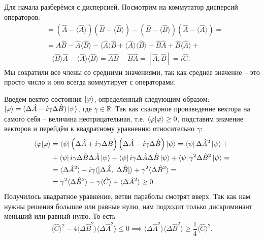 Для начала разберёмся с дисперсией. Посмотрим на коммутатор дисперсий операторов:
\begin{align*}
    [\Delta \hat A, \Delta \hat B] &= \left( \hat A - \langle \hat A \rangle \right) \left( \hat B - \langle \hat B \rangle \right) - \left( \hat B - \langle \hat B \rangle \right) \left( \hat A - \langle \hat A \rangle \right) =\\
    &= \hat A \hat B - \hat A \langle \hat B \rangle - \langle \hat A \rangle \hat B + \langle \hat A \rangle \langle \hat B \rangle - \hat B \hat A + \hat B \langle \hat A \rangle + \\
    &+ \langle \hat B \rangle \hat A - \langle \hat A \rangle \langle \hat B \rangle = \hat A \hat B - \hat B \hat A = [\hat A, \hat B] = i\hat C.
\end{align*}
Мы сократили все члены со средними значениями, так как среднее значение -- это просто число и оно всегда коммутирует с операторами.

Введём вектор состояния $\ket{\varphi}$, определенный следующим образом: $\ket{\varphi} = (\Delta\hat A - i\gamma\Delta\hat B)\ket{\psi}$, где $\gamma \in \mathbb{R}$. Так как скалярное произведение вектора на самого себя -- величина неотрицательная, т.е. $\bra{\varphi}\ket{\varphi} \geq 0$, подставим значение векторов и перейдём к квадратному уравнению относительно $\gamma$:
\begin{align*}
    \bra{\varphi} \ket{\varphi} &= \bra{\psi} \left( \Delta \hat A + i \gamma \Delta \hat B \right) \left( \Delta \hat A - i \gamma \Delta \hat B \right) \ket{\psi} = \bra{\psi} \Delta \hat{A}^2 \ket{\psi} + \\
    &+ \bra{\psi} i \gamma \Delta \hat{B} \Delta \hat{A} \ket{\psi} - \bra{\psi} i \gamma \Delta \hat{A} \Delta \hat{B} \ket{\psi} + \bra{\psi} \gamma^2 \Delta \hat{B}^2 \ket{\psi} = \\
    &= \langle \Delta \hat A^2 \rangle - i \gamma \langle [\Delta \hat{A}, \; \Delta \hat{B}] \rangle + \gamma^2 \langle \Delta \hat B^2 \rangle = \\
    &= \gamma^2 \langle \Delta \hat B^2 \rangle - \gamma \langle \hat{C} \rangle + \langle \Delta \hat A^2 \rangle \geq 0
\end{align*}
Получилось квадратное уравнение, ветви параболы смотрят вверх. Так как нам нужны решения большие или равные нулю, нам подходит только дискриминант меньший или равный нулю. То есть
\[
\langle \hat C \rangle^2 - 4 \langle \Delta \hat B^2 \rangle \langle \Delta \hat A^2 \rangle \leq 0 \implies
\langle \Delta \hat A^2 \rangle \langle \Delta \hat B^2 \rangle \geq \frac{1}{4} \langle \hat C \rangle^2.
\]
